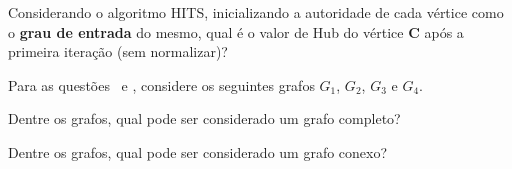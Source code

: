\documentclass[16pt]{examdesign}
\begin{document}
\begin{multiplechoice}[title={Questões de múltipla escolha (3 pontos cada) },rearrange=yes, resetcounter=no,suppressprefix,examcolumns=2,keycolumns=2]
\begin{question}
Considerando o algoritmo HITS, inicializando a autoridade de cada vértice como o \textbf{grau de entrada} do mesmo, 
qual é o valor de Hub do vértice \textbf{C} após a primeira iteração (sem normalizar)?
    \end{question}
 
  \begin{block}[questions=2]
  \columnbreak
  Para as questões \thefirst\ e \thelast, considere os seguintes grafos $G_1$, $G_2$, $G_3$ e $G_4$.
  
  
 

    \begin{question}
      Dentre os grafos, qual pode ser considerado um grafo completo? 
      
    \end{question}      
    \begin{question}
      Dentre os grafos, qual pode ser considerado um grafo conexo?
    \end{question}
        
  \end{block}
\end{multiplechoice}
\end{document}
